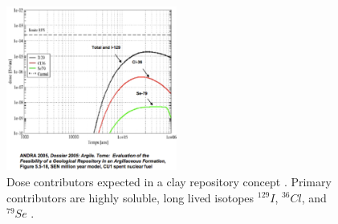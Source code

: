\begin{figure}[htbp!]
  \begin{center}
    \includegraphics[width=0.5\textwidth]{./images/swift_clay_dose.eps}
  \end{center}
  \caption{Dose contributors expected in a clay repository concept 
    \cite{swift_applying_2010}. Primary contributors are highly soluble, long 
    lived isotopes $^{129}I$, $^{36}Cl$, and $^{79}Se$ .}
  \label{fig:swift_clay_dose}
\end{figure}
